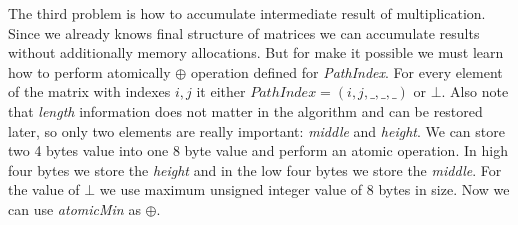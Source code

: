 The third problem is how to accumulate intermediate result of multiplication. Since we already knows final structure of matrices we can accumulate results without additionally memory allocations. But for make it possible we must learn how to perform atomically $\oplus$ operation defined for \textit{PathIndex}. For every element of the matrix with indexes $i,j$ it either $PathIndex = (i,j,\_,\_,\_)$ or $\bot$. Also note that \textit{length} information does not matter in the algorithm and can be restored later, so only two elements are really important: \textit{middle} and \textit{height}. We can store two 4 bytes value into one 8 byte value and perform an atomic operation. In high four bytes we store the \textit{height} and in the low four bytes we store the \textit{middle}. For the value of $\bot$ we use maximum unsigned integer value of 8 bytes in size. Now we can use \textit{atomicMin} as $\oplus$.
